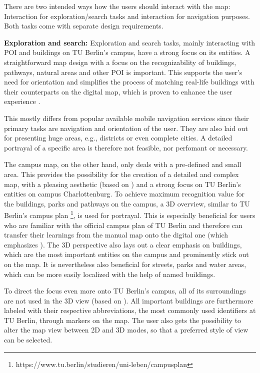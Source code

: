 There are two intended ways how the users should interact with the map: Interaction for exploration/search tasks and interaction for navigation purposes. Both tasks come with separate design requirements.

\textbf{Exploration and search:} Exploration and search tasks, mainly interacting with POI and buildings on TU Berlin's campus, have a strong focus on its entities. A straightforward map design with a focus on the recognizability of buildings, pathways, natural areas and other POI is important. This supports the user's need for orientation and simplifies the process of matching real-life buildings with their counterparts on the digital map, which is proven to enhance the user experience \cite{jakobs_law}.

This mostly differs from popular available mobile navigation services since their primary tasks are navigation and orientation of the user. They are also laid out for presenting huge areas, e.g., districts or even complete cities. A detailed portrayal of a specific area is therefore not feasible, nor perfomant or necessary.

The campus map, on the other hand, only deals with a pre-defined and small area. This provides the possibility for the creation of a detailed and complex map, with a pleasing aesthetic (based on \cite{aesthetic_usability_effect}) and a strong focus on TU Berlin's entities on campus Charlottenburg. To achieve maximum recognition value for the buildings, parks and pathways on the campus, a 3D overview, similar to TU Berlin's campus plan \footnote{https://www.tu.berlin/studieren/uni-leben/campusplan}, is used for portrayal. This is especially beneficial for users who are familiar with the official campus plan of TU Berlin and therefore can transfer their learnings from the manual map onto the digital one (which emphasizes \cite{jakobs_law}). The 3D perspective also lays out a clear emphasis on buildings, which are the most important entities on the campus and prominently stick out on the map. It is nevertheless also beneficial for streets, parks and water areas, which can be more easily localized with the help of named buildings.

To direct the focus even more onto TU Berlin's campus, all of its surroundings are not used in the 3D view (based on \cite{law_of_common_region}). All important buildings are furthermore labeled with their respective abbreviations, the most commonly used identifiers at TU Berlin, through markers on the map. The user also gets the possibility to alter the map view between 2D and 3D modes, so that a preferred style of view can be selected.

